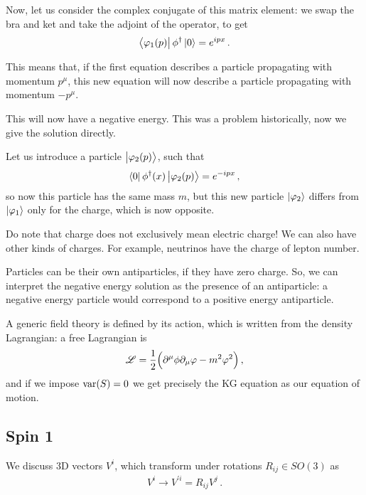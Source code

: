 \documentclass[main.tex]{subfiles}
\begin{document}
Now, let us consider the complex conjugate of this matrix element: we swap the bra and ket and take the adjoint of the operator, to get 
%
\begin{align}
\bra{\varphi_1 (p)} \phi ^\dag \ket{0} = e^{ipx}
\,.
\end{align}

This means that, if the first equation describes a particle propagating with momentum \(p^{\mu }\), this new equation will now describe a particle propagating with momentum \(- p^{\mu }\). 

This will now have a negative energy. 
This was a problem historically, now we give the solution directly. 

Let us introduce a particle \(\ket{\varphi_2 (p)}\), such that 
%
\begin{align}
\bra{0} \phi ^\dag (x) \ket{\varphi_2 (p)} = e^{-ipx}
\,,
\end{align}
%
so now this particle  has the same mass \(m\), but this new particle \(\ket{\varphi_2}\) differs from \(\ket{\varphi_1 }\) only for the charge, which is now opposite. 


Do note that charge does not exclusively mean electric charge! We can also have other kinds of charges. 
For example, neutrinos have the charge of lepton number. 

Particles can be their own antiparticles, if they have zero charge.
So, we can interpret the negative energy solution as the presence of an antiparticle: 
a negative energy particle would correspond to a positive energy antiparticle. 

A generic field theory is defined by its action, which is written from the density Lagrangian: a free Lagrangian is  
%
\begin{align}
\mathscr{L} = \frac{1}{2} \qty(\partial^{\mu } \phi \partial_{\mu } \varphi - m^2 \varphi^2)
\,,
\end{align}
%
and if we impose \(\text{var} \qty(S)=0\) we get precisely the KG equation as our equation of motion. 

\subsection{Spin 1}

We discuss 3D vectors \(V^{i}\), which transform under rotations \(R_{ij} \in SO(3)\) as 
%
\begin{align}
V^{i} \rightarrow V^{\prime i} = R_{ij}V^{j}
\,.
\end{align}
\end{document}
